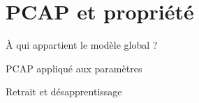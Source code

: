 \section{PCAP et propriété}

\begin{frame}{À qui appartient le modèle global ?}
\end{frame}

\begin{frame}{PCAP appliqué aux paramètres}
\end{frame}

\begin{frame}{Retrait et désapprentissage}
\end{frame}

